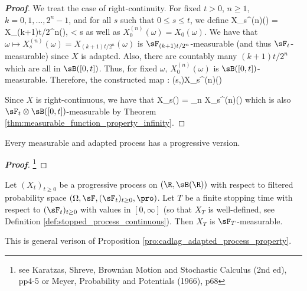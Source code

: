 \begin{proof}[\bf Proof]%
We treat the case of right-continuity. For fixed $t>0$, $n\geq 1$, $k = 0,1,\dots,2^n-1$, and for all $s$ such that $0\leq s\leq t$, we define
\be
X_s^{(n)}(\omega) = X_{(k+1)t/2^n}(\omega),\qquad {} < s \leq {}
\ee
as well as $X_0^{(n)}(\omega) = X_0(\omega)$. We have that $\omega \mapsto X_s^{(n)}(\omega) = X_{(k+1)t/2^n}(\omega)$ is $\sF_{(k+1)t/2^n}$-measurable (and thus $\sF_t$-measurable) since $X$ is adapted. Also, there are countably many $(k+1)t/2^n$ which are all in $\sB([0,t])$. Thus, for fixed $\omega$, $X_0^{(n)}(\omega)$ is $\sB([0,t])$-measurable. Therefore, the constructed map
\be
[0,t]\times \Omega: (s,\omega)\mapsto X_s^{(n)}(\omega)\qquad {}
\ee

Since $X$ is right-continuous, we have that
\be
X_s(\omega) = \lim_{n\to \infty} X_s^{(n)}(\omega)
\ee
which is also $\sF_t\otimes \sB([0,t])$-measurable by Theorem \ref{thm:measurable_function_property_infinity}.
\end{proof}

\begin{proposition}
Every measurable and adapted process has a progressive version.
\end{proposition}

\begin{proof}[\bf Proof]
\footnote{see Karatzas, Shreve, Brownian Motion and Stochastic Calculus (2nd ed), pp4-5 or Meyer, Probability and Potentials (1966), p68}
\end{proof}

\begin{theorem} 
Let $(X_t)_{t\geq 0}$ be a progressive process on $(\R,\sB(\R))$ with respect to filtered probability space $(\Omega,\sF,(\sF_t)_{t\geq 0}, \pro)$. Let $T$ be a finite stopping time with respect to $(\sF_t)_{t\geq 0}$ with values in $[0,\infty]$ (so that $X_T$ is well-defined, see Definition \ref{def:stopped_process_continuous}). Then $X_T$ is $\sF_T$-measurable.
\end{theorem}

\begin{remark}
This is general verison of Proposition \ref{pro:cadlag_adapted_process_property}.
\end{remark}

